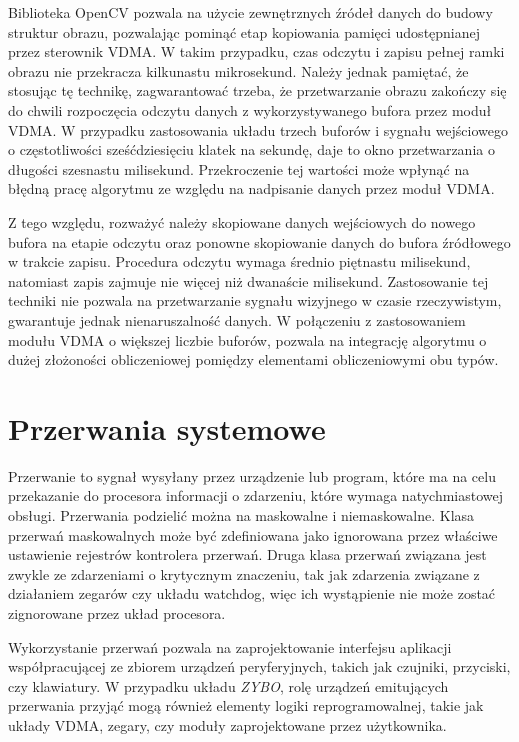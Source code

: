 Biblioteka OpenCV pozwala na użycie zewnętrznych źródeł danych do budowy struktur obrazu, pozwalając pominąć etap kopiowania pamięci udostępnianej przez sterownik VDMA. W takim przypadku, czas odczytu i zapisu pełnej ramki obrazu nie przekracza kilkunastu mikrosekund. Należy jednak pamiętać, że stosując tę technikę, zagwarantować trzeba, że przetwarzanie obrazu zakończy się do chwili rozpoczęcia odczytu danych z wykorzystywanego bufora przez moduł VDMA. W przypadku zastosowania układu trzech buforów i sygnału wejściowego o częstotliwości sześćdziesięciu klatek na sekundę, daje to okno przetwarzania o długości szesnastu milisekund. Przekroczenie tej wartości może wpłynąć na błędną pracę algorytmu ze względu na nadpisanie danych przez moduł VDMA.

Z tego względu, rozważyć należy skopiowane danych wejściowych do nowego bufora na etapie odczytu oraz ponowne skopiowanie danych do bufora źródłowego w trakcie zapisu. Procedura odczytu wymaga średnio piętnastu milisekund, natomiast zapis zajmuje nie więcej niż dwanaście milisekund. Zastosowanie tej techniki nie pozwala na przetwarzanie sygnału wizyjnego w czasie rzeczywistym, gwarantuje jednak nienaruszalność danych. W połączeniu z zastosowaniem modułu VDMA o większej liczbie buforów, pozwala na integrację algorytmu o dużej złożoności obliczeniowej pomiędzy elementami obliczeniowymi obu typów.

\section{Przerwania systemowe}
\label{sec:axi-interrupts}
Przerwanie to sygnał wysyłany przez urządzenie lub program, które ma na celu przekazanie do procesora informacji o zdarzeniu, które wymaga natychmiastowej obsługi.
Przerwania podzielić można na maskowalne i niemaskowalne. Klasa przerwań maskowalnych może być zdefiniowana jako ignorowana przez właściwe ustawienie rejestrów kontrolera przerwań. Druga klasa przerwań związana jest zwykle ze zdarzeniami o krytycznym znaczeniu, tak jak zdarzenia związane z działaniem zegarów czy układu watchdog, więc ich wystąpienie nie może zostać zignorowane przez układ procesora.

Wykorzystanie przerwań pozwala na zaprojektowanie interfejsu aplikacji współpracującej ze zbiorem urządzeń peryferyjnych, takich jak czujniki, przyciski, czy klawiatury. W przypadku układu \emph{ZYBO}, rolę urządzeń emitujących przerwania przyjąć mogą również elementy logiki reprogramowalnej, takie jak układy VDMA, zegary, czy moduły zaprojektowane przez użytkownika.

